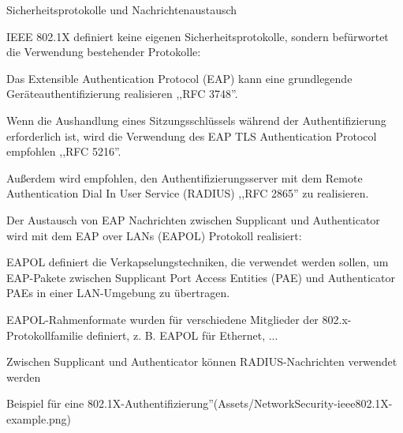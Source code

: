 \documentclass[a4paper]{article}
\begin{document}
\begin{multicols}{3}
      Sicherheitsprotokolle und Nachrichtenaustausch
      \begin{itemize*}
            \item IEEE 802.1X definiert keine eigenen Sicherheitsprotokolle, sondern befürwortet die Verwendung bestehender Protokolle:
            \begin{itemize*}
                  \item Das Extensible Authentication Protocol (EAP) kann eine grundlegende Geräteauthentifizierung realisieren ,,RFC 3748''.
                  \item Wenn die Aushandlung eines Sitzungsschlüssels während der Authentifizierung erforderlich ist, wird die Verwendung des EAP TLS Authentication Protocol empfohlen ,,RFC 5216''.
                  \item Außerdem wird empfohlen, den Authentifizierungsserver mit dem Remote Authentication Dial In User Service (RADIUS) ,,RFC 2865'' zu realisieren.
            \end{itemize*}
            \item Der Austausch von EAP Nachrichten zwischen Supplicant und Authenticator wird mit dem EAP over LANs (EAPOL) Protokoll realisiert:
            \begin{itemize*}
                  \item EAPOL definiert die Verkapselungstechniken, die verwendet werden sollen, um EAP-Pakete zwischen Supplicant Port Access Entities (PAE) und Authenticator PAEs in einer LAN-Umgebung zu übertragen.
                  \item EAPOL-Rahmenformate wurden für verschiedene Mitglieder der 802.x-Protokollfamilie definiert, z. B. EAPOL für Ethernet, ...
                  \item Zwischen Supplicant und Authenticator können RADIUS-Nachrichten verwendet werden
            \end{itemize*}
      \end{itemize*}

      Beispiel für eine 802.1X-Authentifizierung''(Assets/NetworkSecurity-ieee802.1X-example.png)

\end{multicols}
\end{document}
